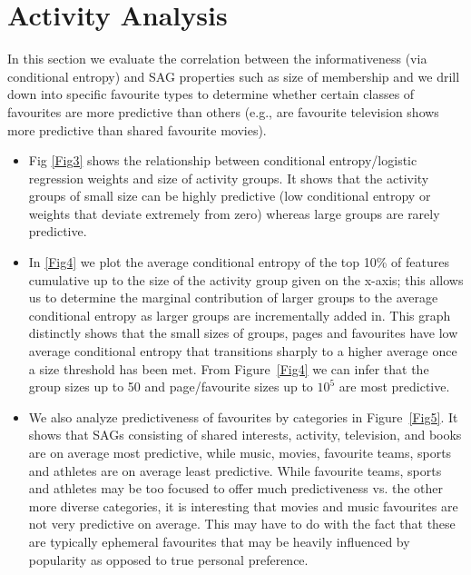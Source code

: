 \section{Activity Analysis}


In this section we evaluate the correlation between the
informativeness (via conditional entropy) and SAG properties such as
size of membership and we drill down into specific favourite types to
determine whether certain classes of favourites are more predictive
than others (e.g., are favourite television shows more predictive than
shared favourite movies).
\begin{itemize}
  \item Fig \ref{Fig3} shows the relationship between conditional
    entropy/logistic regression weights and size of activity
    groups. It shows that the activity groups of small size can be
    highly predictive (low conditional entropy or weights that deviate
    extremely from zero) whereas large groups are rarely predictive.
  \item In \ref{Fig4} we plot the average conditional entropy of the top
    10\% of features cumulative up to the size of the activity group given on the
    x-axis; this allows us to determine the marginal contribution of
    larger groups to the average conditional entropy as larger groups
    are incrementally added in.  This graph 
    distinctly shows that the small sizes of groups, pages and favourites
    have low average conditional entropy that transitions sharply to a
    higher average once a size threshold has been met.  From 
    Figure~\ref{Fig4} we can infer that the group sizes up to 50 and
    page/favourite sizes up to $10^{5}$ are most predictive.
  \item We also analyze predictiveness of favourites by categories in
    Figure~\ref{Fig5}. It shows that SAGs consisting of shared interests,
    activity, television, and books are on average most predictive, while 
    music, movies, favourite teams, sports and athletes are on average
    least predictive.  While favourite teams, sports and athletes may be
    too focused to offer much predictiveness vs. the other more diverse
    categories, it is interesting that movies and music favourites
    are not very predictive on average.  This may have to do with the fact that
    these are typically ephemeral favourites that may be heavily influenced
    by popularity as opposed to true personal preference.
\end{itemize}


